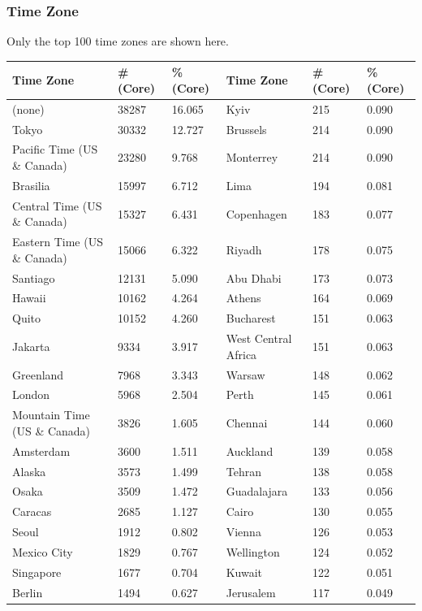 \subsubsection{Time Zone}
Only the top 100 time zones are shown here.\\
\begin{tabular}{| l | l | l | l | l | l |}
\hline
\textbf{Time Zone} & \textbf{\# (Core)} & \textbf{\% (Core)} & \textbf{Time Zone} & \textbf{\# (Core)} & \textbf{\% (Core)} \\ \hline
(none)	&	38287	&	16.065	&	Kyiv	&	215	&	0.090	\\ \hline
Tokyo	&	30332	&	12.727	&	Brussels	&	214	&	0.090	\\ \hline
Pacific Time (US \& Canada)	&	23280	&	9.768	&	Monterrey	&	214	&	0.090	\\ \hline
Brasilia	&	15997	&	6.712	&	Lima	&	194	&	0.081	\\ \hline
Central Time (US \& Canada)	&	15327	&	6.431	&	Copenhagen	&	183	&	0.077	\\ \hline
Eastern Time (US \& Canada)	&	15066	&	6.322	&	Riyadh	&	178	&	0.075	\\ \hline
Santiago	&	12131	&	5.090	&	Abu Dhabi	&	173	&	0.073	\\ \hline
Hawaii	&	10162	&	4.264	&	Athens	&	164	&	0.069	\\ \hline
Quito	&	10152	&	4.260	&	Bucharest	&	151	&	0.063	\\ \hline
Jakarta	&	9334	&	3.917	&	West Central Africa	&	151	&	0.063	\\ \hline
Greenland	&	7968	&	3.343	&	Warsaw	&	148	&	0.062	\\ \hline
London	&	5968	&	2.504	&	Perth	&	145	&	0.061	\\ \hline
Mountain Time (US \& Canada)	&	3826	&	1.605	&	Chennai	&	144	&	0.060	\\ \hline
Amsterdam	&	3600	&	1.511	&	Auckland	&	139	&	0.058	\\ \hline
Alaska	&	3573	&	1.499	&	Tehran	&	138	&	0.058	\\ \hline
Osaka	&	3509	&	1.472	&	Guadalajara	&	133	&	0.056	\\ \hline
Caracas	&	2685	&	1.127	&	Cairo	&	130	&	0.055	\\ \hline
Seoul	&	1912	&	0.802	&	Vienna	&	126	&	0.053	\\ \hline
Mexico City	&	1829	&	0.767	&	Wellington	&	124	&	0.052	\\ \hline
Singapore	&	1677	&	0.704	&	Kuwait	&	122	&	0.051	\\ \hline
Berlin	&	1494	&	0.627	&	Jerusalem	&	117	&	0.049	\\ \hline

\end{tabular}
